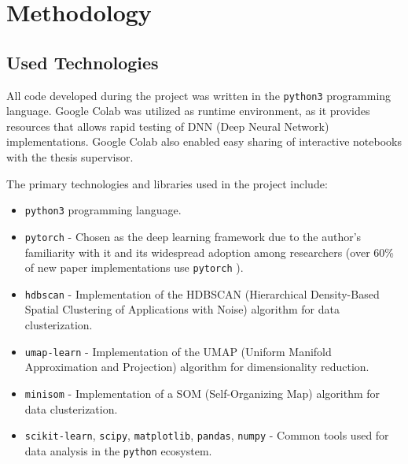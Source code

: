 \section{Methodology}
\subsection{Used Technologies}

All code developed during the project was written in the \texttt{python3} programming language. Google Colab was utilized as runtime environment, as it provides resources that allows rapid testing of DNN (Deep Neural Network) implementations. 
Google Colab also enabled easy sharing of interactive notebooks with the thesis supervisor.

The primary technologies and libraries used in the project include:
\begin{itemize}
    \item \texttt{python3} programming language.
    \item \texttt{pytorch} - Chosen as the deep learning framework due to the author's familiarity with it and its widespread adoption among researchers (over 60\% of new paper implementations use \texttt{pytorch} \cite{papersWithCodeTrends}).
    \item \texttt{hdbscan} - Implementation of the HDBSCAN (Hierarchical Density-Based Spatial Clustering of Applications with Noise) algorithm for data clusterization.
    \item \texttt{umap-learn} - Implementation of the UMAP (Uniform Manifold Approximation and Projection) algorithm for dimensionality reduction.
    \item \texttt{minisom} - Implementation of a SOM (Self-Organizing Map) algorithm for data clusterization.
    \item \texttt{scikit-learn}, \texttt{scipy}, \texttt{matplotlib}, \texttt{pandas}, \texttt{numpy} - Common tools used for data analysis in the \texttt{python} ecosystem.
\end{itemize}
